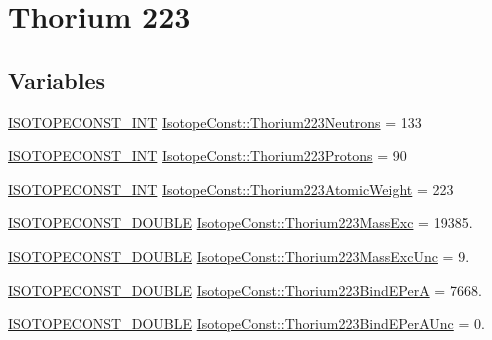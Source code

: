 \hypertarget{group___isotope_const-_thorium-_th223}{}\section{Thorium 223}
\label{group___isotope_const-_thorium-_th223}
\subsection*{Variables}
\begin{DoxyCompactItemize}
\item 
\mbox{\hyperlink{group___isotope_const-_macros_ga5f18360b3e99483a35c32d789e62621c}{I\+S\+O\+T\+O\+P\+E\+C\+O\+N\+S\+T\+\_\+\+I\+NT}} \mbox{\hyperlink{group___isotope_const-_thorium-_th223_ga1d17355da5dc3c03b68cd40a87198062}{Isotope\+Const\+::\+Thorium223\+Neutrons}} = 133
\item 
\mbox{\hyperlink{group___isotope_const-_macros_ga5f18360b3e99483a35c32d789e62621c}{I\+S\+O\+T\+O\+P\+E\+C\+O\+N\+S\+T\+\_\+\+I\+NT}} \mbox{\hyperlink{group___isotope_const-_thorium-_th223_ga2791c5f579119f8c0d4121a09bce0e3e}{Isotope\+Const\+::\+Thorium223\+Protons}} = 90
\item 
\mbox{\hyperlink{group___isotope_const-_macros_ga5f18360b3e99483a35c32d789e62621c}{I\+S\+O\+T\+O\+P\+E\+C\+O\+N\+S\+T\+\_\+\+I\+NT}} \mbox{\hyperlink{group___isotope_const-_thorium-_th223_gacef5b9014501f7e1511b495fc7b44dad}{Isotope\+Const\+::\+Thorium223\+Atomic\+Weight}} = 223
\item 
\mbox{\hyperlink{group___isotope_const-_macros_ga8f45a7272ce02c0b4c65c44636ed719a}{I\+S\+O\+T\+O\+P\+E\+C\+O\+N\+S\+T\+\_\+\+D\+O\+U\+B\+LE}} \mbox{\hyperlink{group___isotope_const-_thorium-_th223_ga47a8dc97b4048bcb9c7d54721f7f5571}{Isotope\+Const\+::\+Thorium223\+Mass\+Exc}} = 19385.
\item 
\mbox{\hyperlink{group___isotope_const-_macros_ga8f45a7272ce02c0b4c65c44636ed719a}{I\+S\+O\+T\+O\+P\+E\+C\+O\+N\+S\+T\+\_\+\+D\+O\+U\+B\+LE}} \mbox{\hyperlink{group___isotope_const-_thorium-_th223_ga15e18c7a147932aab783ac11b80fb360}{Isotope\+Const\+::\+Thorium223\+Mass\+Exc\+Unc}} = 9.
\item 
\mbox{\hyperlink{group___isotope_const-_macros_ga8f45a7272ce02c0b4c65c44636ed719a}{I\+S\+O\+T\+O\+P\+E\+C\+O\+N\+S\+T\+\_\+\+D\+O\+U\+B\+LE}} \mbox{\hyperlink{group___isotope_const-_thorium-_th223_gac201a2c978b5c208d8be511a7a2d52a9}{Isotope\+Const\+::\+Thorium223\+Bind\+E\+PerA}} = 7668.
\item 
\mbox{\hyperlink{group___isotope_const-_macros_ga8f45a7272ce02c0b4c65c44636ed719a}{I\+S\+O\+T\+O\+P\+E\+C\+O\+N\+S\+T\+\_\+\+D\+O\+U\+B\+LE}} \mbox{\hyperlink{group___isotope_const-_thorium-_th223_gae49efda5fe86d9c97fddd2f443fda19f}{Isotope\+Const\+::\+Thorium223\+Bind\+E\+Per\+A\+Unc}} = 0.

\end{DoxyCompactItemize}

